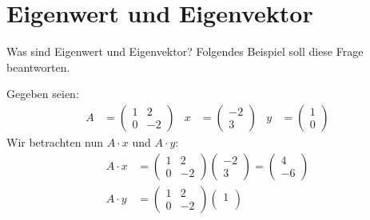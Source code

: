 

\section{Eigenwert und Eigenvektor}

Was sind Eigenwert und Eigenvektor?  Folgendes Beispiel soll diese
Frage beantworten.

\begin{beispiel}
  Gegeben seien:
  \begin{align*}
    A &= \begin{pmatrix}
           1 & 2\\
           0 & -2
         \end{pmatrix}
      &x &= \begin{pmatrix}
              -2\\
              3
            \end{pmatrix}
      &y &= \begin{pmatrix}
              1\\
              0
            \end{pmatrix} 
  \end{align*}
  Wir betrachten nun $A \cdot x$ und $A \cdot y$:
  \begin{align*}
    A \cdot x &= \begin{pmatrix}
                   1 & 2\\
                   0 & -2
                 \end{pmatrix}
                 \begin{pmatrix}
                   -2\\
                   3
                 \end{pmatrix}
               = \begin{pmatrix}
                   4\\
                   -6
                 \end{pmatrix}\\
    A \cdot y &= \begin{pmatrix}
                   1 & 2\\
                   0 & -2
                 \end{pmatrix}
                 \begin{pmatrix}
                   1\\

\end{pmatrix}
\end{align*}
\end{beispiel}
